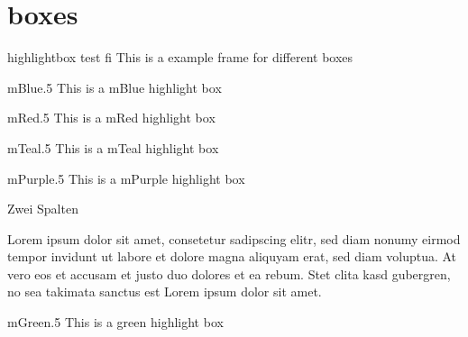\documentclass[10pt,aspectratio=1610,professionalfont]{beamer}
\begin{document}
\section{boxes}

\begin{frame}{highlightbox test fi}
\alert{This is a example frame for different boxes}
	\begin{highlightbox}{mBlue}{.5}
			This is a mBlue highlight box
		\end{highlightbox}
		\begin{highlightbox}{mRed}{.5}
			This is a mRed highlight box
		\end{highlightbox}
		\begin{highlightbox}{mTeal}{.5}
			This is a mTeal highlight box
		\end{highlightbox}
		\begin{highlightbox}{mPurple}{.5}
			This is a mPurple highlight box
		\end{highlightbox}
\end{frame}
\begin{frame}{Zwei Spalten}
\begin{multicols}{2}
		Lorem ipsum dolor sit amet, consetetur sadipscing elitr, sed diam nonumy eirmod tempor invidunt ut labore et dolore magna aliquyam erat, sed diam voluptua. At vero eos et accusam et justo duo dolores et ea rebum. Stet clita kasd gubergren, no sea takimata sanctus est Lorem ipsum dolor sit amet.
		\begin{highlightbox}{mGreen}{.5}
			This is a green highlight box
		\end{highlightbox}
	\end{multicols}

\end{frame}
\end{document}
